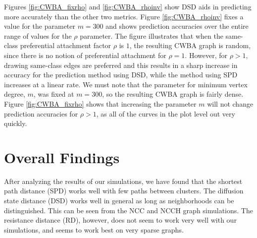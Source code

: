 Figures \ref{fig:CWBA_fixrho} and \ref{fig:CWBA_rhoinv} show DSD aids in
predicting more accurately than the other two metrics. Figure 
\ref{fig:CWBA_rhoinv} fixes a value for the parameter $m = 300$ and shows
prediction accuracies over the entire range of values for the $\rho$
parameter. The figure illustrates that when the same-class preferential
attachment factor $\rho$ is $1$, the resulting CWBA graph is random, since
there is no notion of preferential attachment for $\rho=1$. However, for
$\rho > 1$, drawing same-class edges are preferred and this results in a
sharp increase in accuracy for the prediction method using DSD, while the
method using SPD increases at a linear rate. We must note that the 
parameter for minimum vertex degree, $m$, was fixed at $m=300$, so the
resulting CWBA graph is fairly dense. Figure \ref{fig:CWBA_fixrho} shows 
that increasing the parameter $m$ will not change prediction accuracies for
$\rho > 1$, as all of the curves in the plot level out very quickly.

\section{Overall Findings}
After analyzing the results of our simulations, we have found that the 
shortest path distance (SPD) works well with few paths between clusters. The
diffusion state distance (DSD) works well in general as long as neighborhoods
can be distinguished. This can be seen from the NCC and NCCH graph 
simulations. The resistance distance (RD), however, does not seem to work
very well with our simulations, and seems to work best on very sparse graphs.
